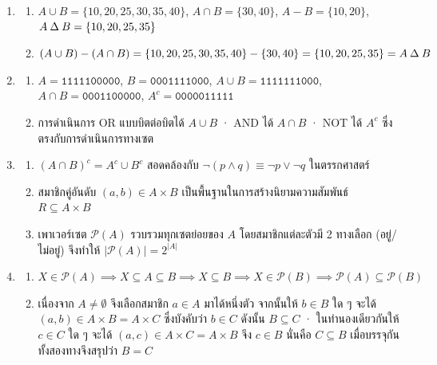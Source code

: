 \begin{enumerate}[resume*=anskey]
    \item
    \begin{enumerate}[label=\textbf{\thechapter.\arabic{enumi}.\arabic*}]
        \item $A \cup B = \{10,20,25,30,35,40\}$, $A \cap B = \{30,40\}$, $A - B = \{10,20\}$, $A \mathbin{\Delta} B = \{10,20,25,35\}$
        \item $(A \cup B) - (A \cap B) = \{10,20,25,30,35,40\} - \{30,40\} = \{10,20,25,35\} = A \mathbin{\Delta} B$
    \end{enumerate}

    \item
    \begin{enumerate}[label=\textbf{\thechapter.\arabic{enumi}.\arabic*}]
        \item $A = \texttt{1111100000}$, $B = \texttt{0001111000}$, $A \cup B = \texttt{1111111000}$, $A \cap B = \texttt{0001100000}$, $A^c = \texttt{0000011111}$
        \item การดำเนินการ OR แบบบิตต่อบิตได้ $A \cup B$ · AND ได้ $A \cap B$ · NOT ได้ $A^c$ ซึ่งตรงกับการดำเนินการทางเซต
    \end{enumerate}

    \item
    \begin{enumerate}[label=\textbf{\thechapter.\arabic{enumi}.\arabic*}]
        \item $(A \cap B)^c = A^c \cup B^c$ สอดคล้องกับ $\neg(p \land q) \equiv \neg p \lor \neg q$ ในตรรกศาสตร์
        \item สมาชิกคู่อันดับ $(a,b) \in A \times B$ เป็นพื้นฐานในการสร้างนิยามความสัมพันธ์ $R \subseteq A \times B$
        \item เพาเวอร์เซต $\mathcal{P}(A)$ รวบรวมทุกเซตย่อยของ $A$ โดยสมาชิกแต่ละตัวมี 2 ทางเลือก (อยู่/ไม่อยู่) จึงทำให้ $|\mathcal{P}(A)| = 2^{|A|}$
    \end{enumerate}

    \item
    \begin{enumerate}[label=\textbf{\thechapter.\arabic{enumi}.\arabic*}]
        \item $X \in \mathcal{P}(A) \implies X \subseteq A \subseteq B \implies X \subseteq B \implies X \in \mathcal{P}(B) \implies \mathcal{P}(A) \subseteq \mathcal{P}(B)$
        \item เนื่องจาก $A \neq \emptyset$ จึงเลือกสมาชิก $a \in A$ มาได้หนึ่งตัว จากนั้นให้ $b \in B$ ใด ๆ จะได้ $(a,b) \in A \times B = A \times C$ ซึ่งบังคับว่า $b \in C$ ดังนั้น $B \subseteq C$ · ในทำนองเดียวกันให้ $c \in C$ ใด ๆ จะได้ $(a,c) \in A \times C = A \times B$ จึง $c \in B$ นั่นคือ $C \subseteq B$ เมื่อบรรจุกันทั้งสองทางจึงสรุปว่า $B = C$
    \end{enumerate}
\end{enumerate}

